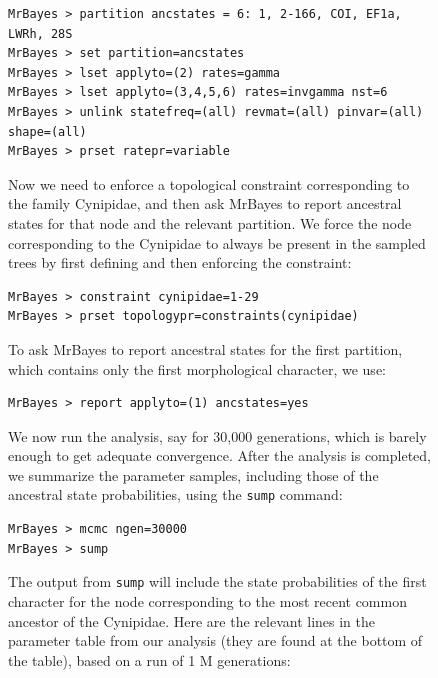 \documentclass[12pt]{book}
\newcommand{\ttt}[1]{\texttt{#1}}
\begin{document}
\begin{figure}[h]
\small
\begin{singlespacing}
\begin{verbatim}
MrBayes > partition ancstates = 6: 1, 2-166, COI, EF1a, LWRh, 28S
MrBayes > set partition=ancstates
MrBayes > lset applyto=(2) rates=gamma
MrBayes > lset applyto=(3,4,5,6) rates=invgamma nst=6
MrBayes > unlink statefreq=(all) revmat=(all) pinvar=(all) shape=(all)
MrBayes > prset ratepr=variable
\end{verbatim}
\end{singlespacing}
\normalsize

Now we need to enforce a topological constraint corresponding to the family Cynipidae, and then ask
MrBayes to report ancestral states for that node and the relevant partition. We force the node
corresponding to the Cynipidae to always be present in the sampled trees by first defining and then
enforcing the constraint:

\small
\begin{singlespacing}
\begin{verbatim}
MrBayes > constraint cynipidae=1-29
MrBayes > prset topologypr=constraints(cynipidae)
\end{verbatim}
\end{singlespacing}
\normalsize

To ask MrBayes to report ancestral states for the first partition, which contains only the first
morphological character, we use:

\small
\begin{singlespacing}
\begin{verbatim}
MrBayes > report applyto=(1) ancstates=yes
\end{verbatim}
\end{singlespacing}
\normalsize

We now run the analysis, say for 30,000 generations, which is barely enough to get adequate
convergence. After the analysis is completed, we summarize the parameter samples, including those
of the ancestral state probabilities, using the \ttt{sump} command:

\small
\begin{singlespacing}
\begin{verbatim}
MrBayes > mcmc ngen=30000
MrBayes > sump
\end{verbatim}
\end{singlespacing}
\normalsize

The output from \ttt{sump} will include the state probabilities of the first character for the node
corresponding to the most recent common ancestor of the Cynipidae. Here are the relevant lines in
the parameter table from our analysis (they are found at the bottom of the table), based on a run
of 1 M generations:


\end{figure}
\end{document}
